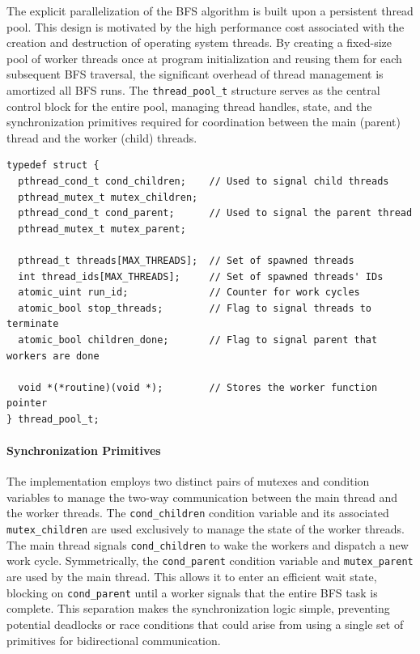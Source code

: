 The explicit parallelization of the BFS algorithm is built upon a persistent thread pool. This design is motivated by the high performance cost associated with the creation and destruction of operating system threads. By creating a fixed-size pool of worker threads once at program initialization and reusing them for each subsequent BFS traversal, the significant overhead of thread management is amortized all BFS runs. The \texttt{thread\_pool\_t} structure serves as the central control block for the entire pool, managing thread handles, state, and the synchronization primitives required for coordination between the main (parent) thread and the worker (child) threads.

\begin{verbatim}
typedef struct {
  pthread_cond_t cond_children;    // Used to signal child threads
  pthread_mutex_t mutex_children;
  pthread_cond_t cond_parent;      // Used to signal the parent thread
  pthread_mutex_t mutex_parent;
  
  pthread_t threads[MAX_THREADS];  // Set of spawned threads
  int thread_ids[MAX_THREADS];     // Set of spawned threads' IDs
  atomic_uint run_id;              // Counter for work cycles
  atomic_bool stop_threads;        // Flag to signal threads to terminate
  atomic_bool children_done;       // Flag to signal parent that workers are done
  
  void *(*routine)(void *);        // Stores the worker function pointer
} thread_pool_t;
\end{verbatim}

\paragraph{Synchronization Primitives} The implementation employs two distinct pairs of mutexes and condition variables to manage the two-way communication between the main thread and the worker threads. The \texttt{cond\_children} condition variable and its associated \texttt{mutex\_children} are used exclusively to manage the state of the worker threads. The main thread signals \texttt{cond\_children} to wake the workers and dispatch a new work cycle. Symmetrically, the \texttt{cond\_parent} condition variable and \texttt{mutex\_parent} are used by the main thread. This allows it to enter an efficient wait state, blocking on \texttt{cond\_parent} until a worker signals that the entire BFS task is complete. This separation makes the synchronization logic simple, preventing potential deadlocks or race conditions that could arise from using a single set of primitives for bidirectional communication.

